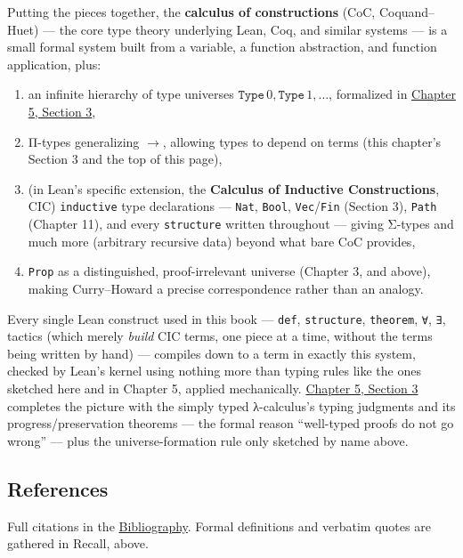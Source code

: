 Putting the pieces together, the \textbf{calculus of constructions} (CoC, Coquand--Huet) --- the core type theory underlying Lean, Coq, and similar systems --- is a small formal system built from a variable, a function abstraction, and function application, plus:

\begin{enumerate}
\def\labelenumi{\arabic{enumi}.}
\tightlist
\item
  an infinite hierarchy of type universes \(\mathtt{Type}\,0,
  \mathtt{Type}\,1, \ldots\), formalized in \hyperref[sec:05-rigor-check:03-typing-rules-and-safety:1]{Chapter 5, Section 3},
\item
  Π-types generalizing \(\to\), allowing types to depend on terms (this chapter's Section 3 and the top of this page),
\item
  (in Lean's specific extension, the \textbf{Calculus of Inductive Constructions}, CIC) \texttt{inductive} type declarations --- \texttt{Nat}, \texttt{Bool}, \texttt{Vec}/\texttt{Fin} (Section 3), \texttt{Path} (Chapter 11), and every \texttt{structure} written throughout --- giving Σ-types and much more (arbitrary recursive data) beyond what bare CoC provides,
\item
  \texttt{Prop} as a distinguished, proof-irrelevant universe (Chapter 3, and above), making Curry--Howard a precise correspondence rather than an analogy.
\end{enumerate}

Every single Lean construct used in this book --- \texttt{def}, \texttt{structure}, \texttt{theorem}, \texttt{∀}, \texttt{∃}, tactics (which merely \emph{build} CIC terms, one piece at a time, without the terms being written by hand) --- compiles down to a term in exactly this system, checked by Lean's kernel using nothing more than typing rules like the ones sketched here and in Chapter 5, applied mechanically. \hyperref[sec:05-rigor-check:03-typing-rules-and-safety:1]{Chapter 5, Section 3} completes the picture with the simply typed λ-calculus's typing judgments and its progress/preservation theorems --- the formal reason ``well-typed proofs do not go wrong'' --- plus the universe-formation rule only sketched by name above.

\subsection{References}\label{sec:01-basics:05-pi-sigma-and-coc:9}

Full citations in the \hyperref[sec:root:bibliography:1]{Bibliography}. Formal definitions and verbatim quotes are gathered in Recall, above.

